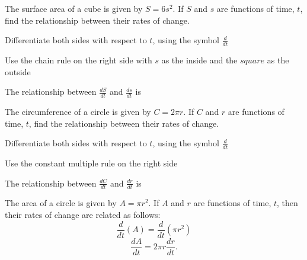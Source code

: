 \documentclass{ximera}
\begin{document}
\begin{question}
The surface area of a cube is given by $S = 6s^2$. If $S$ and $s$ are functions of time, $t$, 
find the relationship between their rates of change.\\
\begin{hint}
Differentiate both sides with respect to $t$, using the symbol $\frac{d}{dt}$
\end{hint}
\begin{hint}
Use the chain rule on the right side with $s$ as the inside and the $square$ as the outside
\end{hint}

The relationship between $\frac{dS}{dt}$ and $\frac{ds}{dt}$ is
\begin{multipleChoice}
\end{multipleChoice}
\end{question}


\begin{question}
The circumference of a circle is given by $C = 2\pi r$. If $C$ and $r$ are functions of time, $t$,
find the relationship between their rates of change.\\
\begin{hint}
Differentiate both sides with respect to $t$, using the symbol $\frac{d}{dt}$
\end{hint}
\begin{hint}
Use the constant multiple rule on the right side
\end{hint}

The relationship between $\frac{dC}{dt}$ and $\frac{dr}{dt}$ is
\begin{multipleChoice}
\end{multipleChoice}
\end{question}



\begin{example}
The area of a circle is given by $A = \pi r^2$. If $A$ and $r$ are functions of time, $t$, 
then their rates of change are related as follows:
\[\frac{d}{dt} (A) = \frac{d}{dt}(\pi r^2)\]
\[\frac{dA}{dt}  = 2\pi r \frac{dr}{dt}.\]
\end{example}
\end{document}
